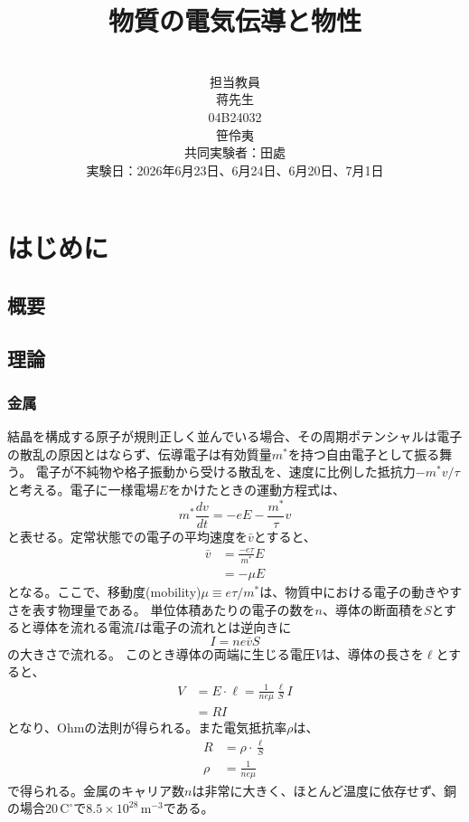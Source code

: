 \documentclass[11pt, titlepage, openany]{ltjsbook}
\title{\huge{物質の電気伝導と物性}}
\author{\vspace{3cm}\\
\Large{担当教員}\\
\vspace{2cm}\Large{蒋先生}\\
\Large{04B24032}\\
\Large{笹伶夷}\\
\vspace{2cm}\Large{共同実験者：田處}\\
\Large{実験日：2026年6月23日、6月24日、6月20日、7月1日}
}
\date{}
\begin{document}
\maketitle
\tableofcontents
\clearpage

\chapter{はじめに}
\section{概要}
\section{理論}
\subsection{金属}
結晶を構成する原子が規則正しく並んでいる場合、その周期ポテンシャルは電子の散乱の原因とはならず、伝導電子は有効質量$m^{*}$を持つ自由電子として振る舞う。
電子が不純物や格子振動から受ける散乱を、速度に比例した抵抗力$-m^{*}v/\tau$と考える。電子に一様電場$E$をかけたときの運動方程式は、
\begin{equation}
  m^{*} \frac{dv}{dt} = -eE -\frac{m^{*}}{\tau} v
\end{equation}
と表せる。定常状態での電子の平均速度を$\bar{v}$とすると、
\begin{align}
  \bar{v} & = \frac{-e\tau}{m^{*}} E \\
  & = - \mu E
\end{align}
となる。ここで、移動度(mobility)$\mu \equiv e\tau/m^{*}$は、物質中における電子の動きやすさを表す物理量である。
単位体積あたりの電子の数を$n$、導体の断面積を$S$とすると導体を流れる電流$I$は電子の流れとは逆向きに
\begin{equation}
  I = ne\bar{v}S
\end{equation}
の大きさで流れる。
このとき導体の両端に生じる電圧$V$は、導体の長さを$\ell$とすると、
\begin{align}
  V & = E \cdot \ell = \frac{1}{n e \mu} \frac{\ell}{S} I \\
  & = R I
\end{align}
となり、Ohmの法則が得られる。また電気抵抗率$\rho$は、
\begin{align}
  R & = \rho \cdot \frac{\ell}{S} \\
  \rho & = \frac{1}{ne\mu}
\end{align}
で得られる。金属のキャリア数$n$は非常に大きく、ほとんど温度に依存せず、銅の場合$20\,\mathrm{C^{\circ}}$で$8.5\times10^{28}\,\mathrm{m^{-3}}$である。
\end{document}

